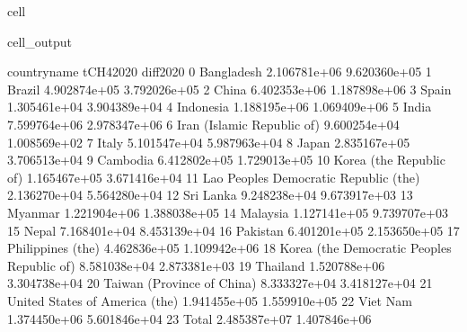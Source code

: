 \documentclass[letterpaper,10pt,english]{jupyterBook}
\begin{document}
\begin{sphinxuseclass}{cell}
\begin{sphinxVerbatimOutput}
\begin{sphinxuseclass}{cell_output}
\begin{sphinxVerbatim}[commandchars=\\\{\}]
                                   country\PYGZus{}name     tCH4\PYGZus{}2020     diff\PYGZus{}2020  \PYGZbs{}
0                                    Bangladesh  2.106781e+06 \PYGZhy{}9.620360e+05   
1                                        Brazil  4.902874e+05 \PYGZhy{}3.792026e+05   
2                                         China  6.402353e+06 \PYGZhy{}1.187898e+06   
3                                         Spain  1.305461e+04  3.904389e+04   
4                                     Indonesia  1.188195e+06  1.069409e+06   
5                                         India  7.599764e+06 \PYGZhy{}2.978347e+06   
6                    Iran (Islamic Republic of)  9.600254e+04  1.008569e+02   
7                                         Italy  5.101547e+04  5.987963e+04   
8                                         Japan  2.835167e+05  3.706513e+04   
9                                      Cambodia  6.412802e+05 \PYGZhy{}1.729013e+05   
10                      Korea (the Republic of)  1.165467e+05  3.671416e+04   
11       Lao People\PYGZsq{}s Democratic Republic (the)  2.136270e+04  5.564280e+04   
12                                    Sri Lanka  9.248238e+04  9.673917e+03   
13                                      Myanmar  1.221904e+06 \PYGZhy{}1.388038e+05   
14                                     Malaysia  1.127141e+05  9.739707e+03   
15                                        Nepal  7.168401e+04  8.453139e+04   
16                                     Pakistan  6.401201e+05 \PYGZhy{}2.153650e+05   
17                            Philippines (the)  4.462836e+05  1.109942e+06   
18  Korea (the Democratic People\PYGZsq{}s Republic of)  8.581038e+04 \PYGZhy{}2.873381e+03   
19                                     Thailand  1.520788e+06  3.304738e+04   
20                   Taiwan (Province of China)  8.333327e+04 \PYGZhy{}3.418127e+04   
21               United States of America (the)  1.941455e+05  1.559910e+05   
22                                     Viet Nam  1.374450e+06 \PYGZhy{}5.601846e+04   
23                                        Total  2.485387e+07 \PYGZhy{}1.407846e+06   


\end{sphinxVerbatim}
\end{sphinxuseclass}
\end{sphinxVerbatimOutput}
\end{sphinxuseclass}
\end{document}
